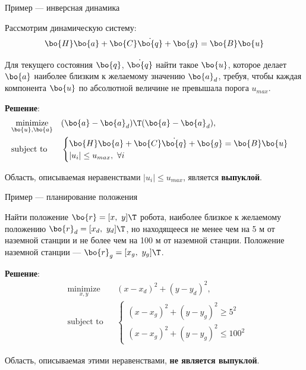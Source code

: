 \documentclass{beamer}
\begin{document}
\begin{frame}{Пример — инверсная динамика}
	\begin{flushleft}
		
		Рассмотрим динамическую систему:
		\begin{equation}
			\bo{H} \bo{a} + \bo{C}\dot{\bo{q}} + \bo{g} = \bo{B}\bo{u}
		\end{equation}
		
		Для текущего состояния $\bo{q}$, $\dot{\bo{q}}$ найти такое $\bo{u}$, которое делает $\bo{a}$ наиболее близким к желаемому значению $\bo{a}_d$, \textcolor{mydarkred}{требуя, чтобы каждая компонента $\bo{u}$ по абсолютной величине не превышала порога $u_{max}$}.
		
		\bigskip
		
		\textbf{Решение}:
		\begin{equation}
			\begin{aligned}
				& \underset{\bo{u}, \bo{a}}{\text{minimize}}
				& & (\bo{a}-\bo{a}_d)\T (\bo{a}-\bo{a}_d), \\
				& \text{subject to}
				& & \begin{cases}
					\bo{H} \bo{a} + \bo{C}\dot{\bo{q}} + \bo{g} = \bo{B}\bo{u} \\
					|u_i| \leq u_{max}, \ \forall i
				\end{cases}
			\end{aligned}
		\end{equation}
		
		Область, описываемая неравенствами $|u_i| \leq u_{max}$, является \textbf{выпуклой}.
		
	\end{flushleft}
\end{frame}

\begin{frame}{Пример — планирование положения}
	\begin{flushleft}
		
		Найти положение $\bo{r} = [x, \ y]\T$ робота, наиболее близкое к желаемому положению $\bo{r}_d= [x_d, \ y_d]\T$, но \textcolor{mydarkred}{находящееся не менее чем на 5 м от наземной станции и не более чем на 100 м от наземной станции.} Положение наземной станции — $\bo{r}_g= [x_g, \ y_g]\T$.
		
		\bigskip
		
		\textbf{Решение}:
		\begin{equation}
			\begin{aligned}
				& \underset{x, y}{\text{minimize}}
				& & (x-x_d)^2 + (y-y_d)^2, \\
				& \text{subject to}
				& & \begin{cases}
					(x-x_g)^2 + (y-y_g)^2 \ge 5^2 \\
					(x-x_g)^2 + (y-y_g)^2 \le 100^2
				\end{cases}
			\end{aligned}
		\end{equation}
		
		Область, описываемая этими неравенствами, \textbf{не является выпуклой}.
		
	\end{flushleft}
\end{frame}
\end{document}
